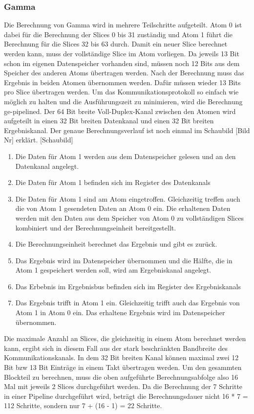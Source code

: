 \subsubsection{Gamma}
Die Berechnung von Gamma wird in mehrere Teilschritte aufgeteilt. Atom 0 ist dabei für die Berechnung der Slices 0 bis 31 zuständig und Atom 1
führt die Berechnung für die Slices 32 bis 63 durch. Damit ein neuer Slice berechnet werden kann, muss der vollständige Slice im Atom vorliegen.
Da jeweils 13 Bit schon im eigenen Datenspeicher vorhanden sind, müssen noch 12 Bits aus dem Speicher des anderen Atoms übertragen werden.
Nach der Berechnung muss das Ergebnis in beiden Atomen übernommen werden. Dafür müssen wieder 13 Bits pro Slice übertragen werden.
Um das Kommunikationsprotokoll so einfach wie möglich zu halten und die Ausführungszeit zu minimieren, wird die Berechnung ge-pipelined.
Der 64 Bit breite Voll-Duplex-Kanal zwischen den Atomen wird aufgeteilt in einen 32 Bit breiten Datenkanal und einen 32 Bit breiten Ergebniskanal.
Der genaue Berechnungsverlauf ist noch einmal im Schaubild [Bild Nr] erklärt.
[Schaubild]
\begin{enumerate}
\item Die Daten für Atom 1 werden aus dem Datenspeicher gelesen und an den Datenkanal angelegt.
\item Die Daten für Atom 1 befinden sich im Register des Datenkanals
\item Die Daten für Atom 1 sind am Atom eingetroffen. Gleichzeitig treffen auch die von Atom 1 gesendeten Daten an Atom 0 ein.
Die erhaltenen Daten werden mit den Daten aus dem Speicher von Atom 0 zu vollständigen Slices kombiniert und der Berechnungseinheit bereitgestellt.
\item Die Berechnungseinheit berechnet das Ergebnis und gibt es zurück.
\item Das Ergebnis wird im Datenspeicher übernommen und die Hälfte, die in Atom 1 gespeichert werden soll, wird am Ergebniskanal angelegt.
\item Das Erbebnis im Ergebnisbus befinden sich im Register des Ergebniskanals
\item Das Ergebnis trifft in Atom 1 ein. Gleichzeitig trifft auch das Ergebnis von Atom 1 in Atom 0 ein.
Das erhaltene Ergebnis wird im Datenspeicher übernommen.
\end{enumerate}
Die maximale Anzahl an Slices, die gleichzeitig in einem Atom berechnet werden kann, ergibt sich in diesem Fall aus der stark beschränkten Bandbreite
des Kommunikationskanals. In dem 32 Bit breiten Kanal können maximal zwei 12 Bit bzw 13 Bit Einträge in einem Takt übertragen werden.
Um den gesammten Blockteil zu berechnen, muss die oben aufgeführte Berechnungsabfolge also 16 Mal mit jeweils 2 Slices durchgeführt werden.
Da die Berechnung der 7 Schritte in einer Pipeline durchgeführt wird, beträgt die Berechnungsdauer nicht 16 * 7 = 112 Schritte,
sondern nur 7 + (16 - 1) = 22 Schritte.

